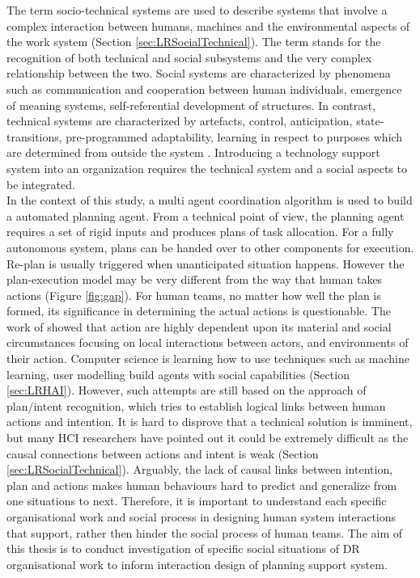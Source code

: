 The term socio-technical systems are used to describe systems that involve a complex interaction between humans, machines and the environmental aspects of the work system (Section \ref{sec:LRSocialTechnical}). The term stands for the recognition of both technical and social subsystems and the very complex relationship between the two. Social systems are characterized by phenomena such as communication and cooperation between human individuals, emergence of meaning systems, self-referential development of structures. In contrast, technical systems are characterized by artefacts, control, anticipation, state-transitions, pre-programmed adaptability, learning in respect to purposes which are determined from outside the system \cite{Ropohl1999}. Introducing a technology support system into an organization requires the technical system and a social aspects to be integrated.\\

In the context of this study, a multi agent coordination algorithm is used to build a automated planning agent. From a technical point of view,  the planning agent requires a set of rigid inputs and produces plans of task allocation. For a fully autonomous system, plans can be handed over to other components for execution. Re-plan is usually triggered when unanticipated situation happens. However the plan-execution model may be very different from the way that human takes actions (Figure \ref{fig:gap}). For human teams, no matter how well the plan is formed, its significance in determining the actual actions is questionable. The work of \cite{Suchman1987} showed that action are highly dependent upon its material and social circumstances focusing on local interactions between actors, and environments of their action. Computer science is learning how to use techniques such as machine learning, user modelling build agents with social capabilities (Section \ref{sec:LRHAI}). However, such attempts are still based on the approach of plan/intent recognition, which tries to establish logical links between human actions and intention.  It is hard to disprove that a technical solution is imminent, but many \ac{HCI} researchers have pointed out it could be extremely difficult as the causal connections between actions and intent is weak (Section \ref{sec:LRSocialTechnical}). Arguably, the lack of causal links between intention, plan and actions makes human behaviours hard to predict and generalize from one situations to next. Therefore, it is important to understand each specific organisational work and social process in designing human system interactions that support, rather then hinder the social process of human teams. The aim of this thesis is to conduct investigation of specific social situations of \ac{DR} organisational work to inform interaction design of planning support system. \\

